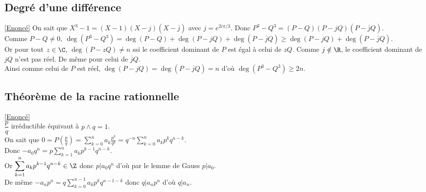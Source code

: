 \documentclass{book}
\begin{document}
	\subsection{Degré d'une différence }
	\label{sec:degré-d'une-différence}
	\textcolor{blue}{\hyperref[Degré d'une différence]{[Enoncé]}}
	On sait que $X^3-1=(X-1)(X-j)(X-\overline j)$ avec $j=e^{2i\pi/3}$. Donc $P^3-Q^3=(P-Q)(P-jQ)(P-\overline jQ)$.\\
	Comme $P-Q\ne 0,\ \deg(P^3-Q^3)=\deg(P-Q)+\deg(P-jQ)+\deg(P-\overline jQ)\geq \deg(P-jQ)+\deg(P-\overline jQ)$.\\
	Or pour tout $z\in \C$, $\deg(P-zQ)\ne n$ ssi le coefficient dominant de $P$ est égal à celui de $zQ$. Comme $j\notin\R$, le coefficient dominant de $jQ$ n'est pas réel. De même pour celui de $\overline jQ$.\\
	Ainsi comme celui de $P$ est réel, $\deg(P-jQ)=\deg(P-\overline jQ)=n$ d'où $\deg(P^3-Q^3)\geq 2n$.
	
	\subsection{Théorème de la racine rationnelle }
	\label{sec:theoreme-de-la-racine-rationnelle}
	\textcolor{blue}{\hyperref[Théorème de la racine rationnelle]{[Enoncé]}}\\
	$\dfrac{p}{q}$ irréductible équivaut à $p\wedge q=1$.\\
	On sait que $0=\displaystyle P\left(\frac{p}{q}\right)=\sum_{k=0}^na_k\frac{p^k}{q^k}=q^{-n}\sum_{k=0}^na_kp^kq^{n-k}$.\\
	Donc $-a_0q^n=\displaystyle p\sum_{k=1}^na_kp^{k-1}q^{n-k}$.\\
	Or $\displaystyle\sum_{k=1}^na_kp^{k-1}q^{n-k}\in \Z$ donc $p|a_0q^n$ d'où par le lemme de Gauss $p|a_0$.\\
	De même $-a_np^n=\displaystyle q\sum_{k=0}^{n-1}a_kp^kq^{n-1-k}$ donc $q|a_np^n$ d'où $q|a_n$.
	
\end{document}
